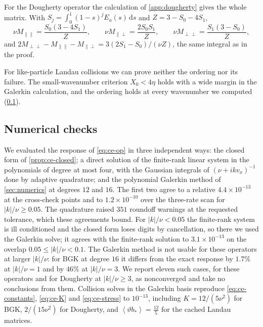 \documentclass[11pt]{article}
\newcommand{\dd}{\,\mathrm d}
\newcommand{\av}[1]{\left\langle #1\right\rangle}
\theoremstyle{definition}
\theoremstyle{remark}
\numberwithin{equation}{section}
\begin{document}
For the Dougherty operator the calculation of \cref{app:dougherty} gives
the whole matrix. With $S_j=\int_0^1(1-s)^jE_a(s)\dd s$ and
$Z=3-S_0-4S_1$,
\[
 \nu M_{\parallel\parallel}=\frac{S_0(3-4S_1)}Z,\qquad
 \nu M_{\parallel\perp}=\frac{2S_0S_1}Z,\qquad
 \nu M_{\perp\perp}=\frac{S_1(3-S_0)}Z,
\]
and $2M_{\perp\perp}-M_{\parallel\parallel}-M_{\parallel\perp}
=3(2S_1-S_0)/(\nu Z)$, the same integral as in the proof.

For like-particle Landau collisions we can prove neither the ordering
nor its failure. The small-wavenumber criterion $X_0<4\eta$ holds with a
wide margin in the Galerkin calculation, and the ordering holds at every
wavenumber we computed (\cref{sec:ce-numerics}).

\subsection{Numerical checks}\label{sec:ce-numerics}

We evaluated the response of \eqref{eq:ce-op} in three independent ways:
the closed form of \cref{prop:ce-closed}; a direct solution of the
finite-rank linear system in the polynomials of degree at most four, with
the Gaussian integrals of $(\nu+ikv_x)^{-1}$ done by adaptive quadrature;
and the polynomial Galerkin method of \cref{sec:numerics} at degrees $12$
and $16$. The first two agree to a relative $4.4\times10^{-13}$ at the
cross-check points and to $1.2\times10^{-10}$ over the three-rate scan
for $|k|/\nu\geq0.05$. The quadrature raised $351$ roundoff warnings at
the requested tolerance, which these agreements bound. For
$|k|/\nu<0.05$ the finite-rank system is ill conditioned and the closed
form loses digits by cancellation, so there we used the Galerkin solve;
it agrees with the finite-rank solution to $3.1\times10^{-13}$ on the
overlap $0.05\leq|k|/\nu<0.1$. The Galerkin method is not usable for
these operators at larger $|k|/\nu$: for BGK at degree $16$ it differs
from the exact response by $1.7\%$ at $|k|/\nu=1$ and by $46\%$ at
$|k|/\nu=3$. We report eleven such cases, for these operators and for
Dougherty at $|k|/\nu\geq3$, as nonconverged and take no conclusions
from them. Collision solves in the Galerkin basis reproduce
\eqref{eq:ce-constants}, \eqref{eq:ce-K} and \eqref{eq:ce-stress} to
$10^{-13}$, including $K=12/(5\nu^2)$ for BGK, $2/(15\nu^2)$ for
Dougherty, and $\av{\vartheta b_*}=\tfrac{12}5$ for the cached Landau
matrices.
\end{document}
